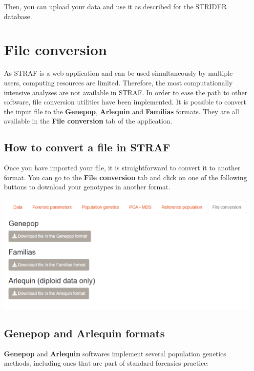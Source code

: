 \documentclass[
]{book}
\begin{document}
Then, you can upload your data and use it as described for the STRIDER database.

\hypertarget{file-conversion}{%
\chapter{File conversion}\label{file-conversion}}

As STRAF is a web application and can be used simultaneously by multiple users,
computing resources are limited. Therefore, the most computationally intensive analyses
are not available in STRAF. In order to ease the path to other software,
file conversion utilities have been implemented. It is possible to convert
the input file to the \textbf{Genepop}, \textbf{Arlequin} and \textbf{Familias} formats. They are
all available in the \textbf{File conversion} tab of the application.

\hypertarget{how-to-convert-a-file-in-straf}{%
\section{How to convert a file in STRAF}\label{how-to-convert-a-file-in-straf}}

Once you have imported your file, it is straightforward to convert it to another
format. You can go to the \textbf{File conversion} tab and click on one of the following
buttons to download your genotypes in another format.

\includegraphics[width=1\linewidth]{img/capture_file_conversion_1}

\hypertarget{genepop-and-arlequin-formats}{%
\section{Genepop and Arlequin formats}\label{genepop-and-arlequin-formats}}

\textbf{Genepop} \citep{ref_genepop} and \textbf{Arlequin} \citep{ref_arlequin} softwares implement several population genetics methods,
including ones that are part of standard forensics practice:
\end{document}
